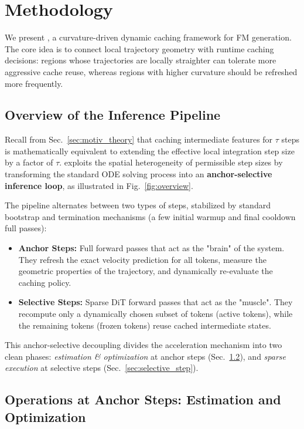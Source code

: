 \section{Methodology}
\label{sec:method}

We present \cubic, a curvature-driven dynamic caching framework for FM generation. The core idea is to connect local trajectory geometry with runtime caching decisions: regions whose trajectories are locally straighter can tolerate more aggressive cache reuse, whereas regions with higher curvature should be refreshed more frequently. 

\subsection{Overview of the Inference Pipeline}
\label{sec:method_overview}

Recall from Sec.~\ref{sec:motiv_theory} that caching intermediate features for $\tau$ steps is mathematically equivalent to extending the effective local integration step size by a factor of $\tau$. \cubic exploits the spatial heterogeneity of permissible step sizes by transforming the standard ODE solving process into an \textbf{anchor-selective inference loop}, as illustrated in Fig.~\ref{fig:overview}. 

The pipeline alternates between two types of steps, stabilized by standard bootstrap and termination mechanisms (a few initial warmup and final cooldown full passes):
\begin{itemize}
    \item \textbf{Anchor Steps:} Full forward passes that act as the "brain" of the system. They refresh the exact velocity prediction for all tokens, measure the geometric properties of the trajectory, and dynamically re-evaluate the caching policy.
    \item \textbf{Selective Steps:} Sparse DiT forward passes that act as the "muscle". They recompute only a dynamically chosen subset of tokens (active tokens), while the remaining tokens (frozen tokens) reuse cached intermediate states.
\end{itemize}
This anchor-selective decoupling divides the acceleration mechanism into two clean phases: \emph{estimation \& optimization} at anchor steps (Sec.~\ref{sec:anchor_step}), and \emph{sparse execution} at selective steps (Sec.~\ref{sec:selective_step}).

\subsection{Operations at Anchor Steps: Estimation and Optimization}
\label{sec:anchor_step}

